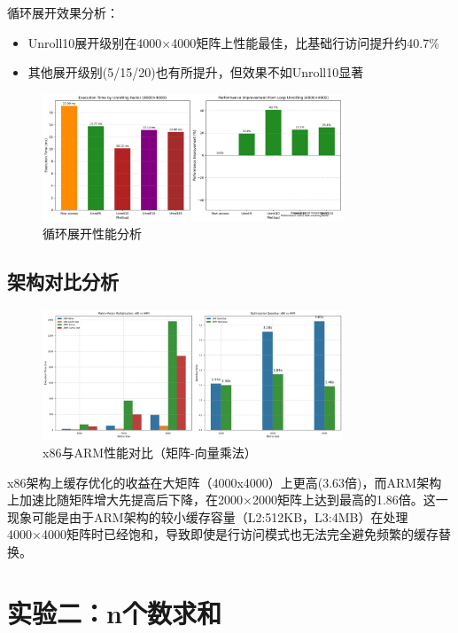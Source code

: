 \documentclass[a4paper,colorlinks=true,linkcolor=blue,urlcolor=blue,citecolor=green,bookmarks=true]{article}
\begin{document}
循环展开效果分析：
\begin{itemize}
  \item Unroll10展开级别在4000×4000矩阵上性能最佳，比基础行访问提升约40.7\%
  \item 其他展开级别(5/15/20)也有所提升，但效果不如Unroll10显著
\end{itemize}

\begin{figure}[htbp]
  \centering
  \includegraphics[width=0.8\textwidth]{loop_unrolling_performance.png}
  \caption{循环展开性能分析}
  \label{fig:loop_unrolling}
\end{figure}

\subsection{架构对比分析}

\begin{figure}[htbp]
  \centering
  \includegraphics[width=0.8\textwidth]{matrix_arch_comparison.png}
  \caption{x86与ARM性能对比（矩阵-向量乘法）}
  \label{fig:matrix_arch_comparison}
\end{figure}

x86架构上缓存优化的收益在大矩阵（4000x4000）上更高(3.63倍)，而ARM架构上加速比随矩阵增大先提高后下降，在2000×2000矩阵上达到最高的1.86倍。这一现象可能是由于ARM架构的较小缓存容量（L2:512KB，L3:4MB）在处理4000×4000矩阵时已经饱和，导致即使是行访问模式也无法完全避免频繁的缓存替换。

\section{实验二：n个数求和}
\end{document}
